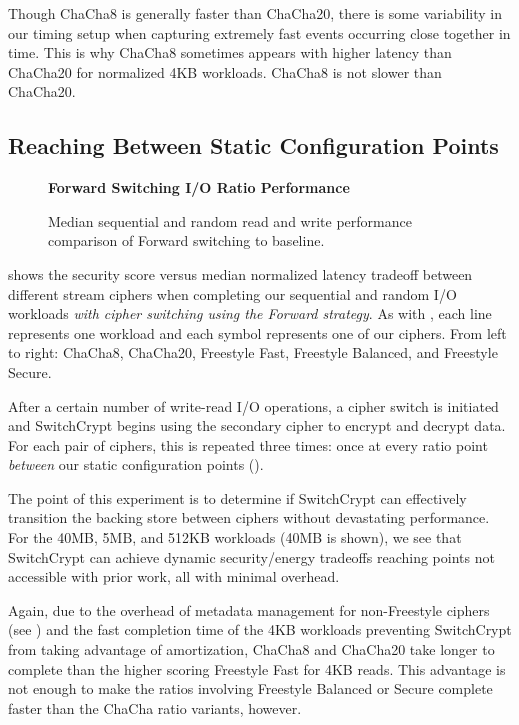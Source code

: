 Though ChaCha8 is generally faster than ChaCha20, there is some variability in
our timing setup when capturing extremely fast events occurring close together
in time. This is why ChaCha8 sometimes appears with higher latency than
ChaCha20 for normalized 4KB workloads. ChaCha8 is not slower than ChaCha20.

\subsection{Reaching Between Static Configuration Points}\label{subsec:2}

\begin{figure}[ht]
  \textbf{Forward Switching I/O Ratio Performance}\par\medskip
  {} \caption{Median sequential and
  random read and write performance comparison of Forward switching to
  baseline.}
 \label{fig:tradeoff-with-ratios}
\end{figure}

 shows the security score versus median normalized
latency tradeoff between different stream ciphers when completing our sequential
and random I/O workloads \emph{with cipher switching using the Forward
strategy}. As with , each line represents one
workload and each symbol represents one of our ciphers. From left to right:
ChaCha8, ChaCha20, Freestyle Fast, Freestyle Balanced, and Freestyle Secure.

After a certain number of write-read I/O operations, a cipher switch is
initiated and SwitchCrypt begins using the secondary cipher to encrypt and
decrypt data. For each pair of ciphers, this is repeated three times: once at
every ratio point \emph{between} our static configuration points ().

The point of this experiment is to determine if SwitchCrypt can effectively
transition the backing store between ciphers without devastating performance.
For the 40MB, 5MB, and 512KB workloads (40MB is shown), we see that SwitchCrypt
can achieve dynamic security/energy tradeoffs reaching points not accessible
with prior work, all with minimal overhead.

Again, due to the overhead of metadata management for non-Freestyle ciphers (see
) and the fast completion time of the 4KB workloads
preventing SwitchCrypt from taking advantage of amortization, ChaCha8 and
ChaCha20 take longer to complete than the higher scoring Freestyle Fast for 4KB
reads. This advantage is not enough to make the ratios involving Freestyle
Balanced or Secure complete faster than the ChaCha ratio variants, however.

